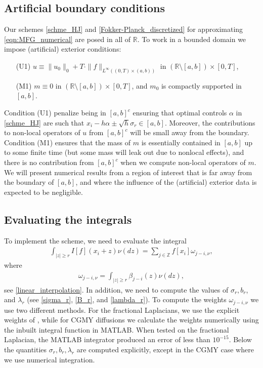 \documentclass[a4paper,  twoside, 10pt, leqno]{amsart}
\theoremstyle{remark}
\theoremstyle{definition}
\begin{document}
\subsection*{Artificial boundary conditions}
Our schemes \eqref{schme_HJ} and \eqref{Fokker-Planck_discretized} for approximating \eqref{eqn:MFG_numerical} are posed in all of $\mathbb{R}$. To work in a bounded domain we impose (artificial) exterior conditions: 
\begin{enumerate}
    \item[(U1)] $u \equiv \| u_{0}  \|_{0} + T \cdot \| f  \|_{L^{\infty} ( ( 0,T ) \times ( a,b ) )}  $ in $(\mathbb{R} \setminus [ a,b ] ) \times [ 0,T ]$, 
        \medskip
    \item[(M1)]  $m \equiv 0$ in $(\mathbb{R} \setminus [ a,b ] ) \times [ 0,T ]$, and
        $m_{0}$ is compactly supported in $ [ a,b ]$.
        \medskip
\end{enumerate}
Condition (U1)  penalize being in $[a,b]^c$  ensuring that optimal controls  $\alpha$ in \eqref{schme_HJ} are such that $x_{i} - h \alpha \pm \sqrt{h} \sigma_{r} \in [a,b]$. 
Moreover, the contributions to non-local operators of $u$ from $[a,b ]^c$ will be small away from the boundary.
Condition (M1) ensures that the mass of $m$ is essentially contained in $[a,b]$ up to some finite time (but some mass will leak out due to nonlocal effects), and there is no contribution from $[ a,b ]^c$ when we compute non-local operators of $m$.  We will present numerical results from a region of interest that is far away from the boundary of $[a,b ]$, and where the influence of the (artificial) exterior data is expected to be negligible.



\subsection*{Evaluating the integrals}
To implement the scheme, we need to evaluate the integral 
\begin{align*}
    \int_{|z| \geq r} I [ f ] ( x_{i} + z ) \nu ( dz ) = \sum_{j \in \mathbb{Z}} f [ x_{i} ] \omega_{j-i, \nu} ,  
\end{align*}
where 
\begin{align*}
    \omega_{j-i, \nu} = \int_{|z| \geq r } \beta_{j-i} ( z ) \nu ( dz ),
\end{align*}
see \eqref{linear_interpolation}. 
In addition, we need to compute the values of $\sigma_{r}, b_{r}$,  and $\lambda_{r}$ (see \eqref{sigma_r}, \eqref{B_r}, and \eqref{lambda_r}).
To compute the weights $\omega_{j-i, \nu}$ we use two different methods. 
For the fractional Laplacians, 
we use the explicit weights of \cite{huang2014numerical}, while for CGMY diffusions we calculate the weights numerically using the inbuilt integral function in MATLAB. 
When tested on the fractional Laplacian, the MATLAB integrator produced an error of less than $10^{-15}$. Below the quantities $\sigma_{r}, b_{r}, \lambda_{r}$ are computed explicitly, except in the CGMY case where we use numerical integration. 
\end{document}
